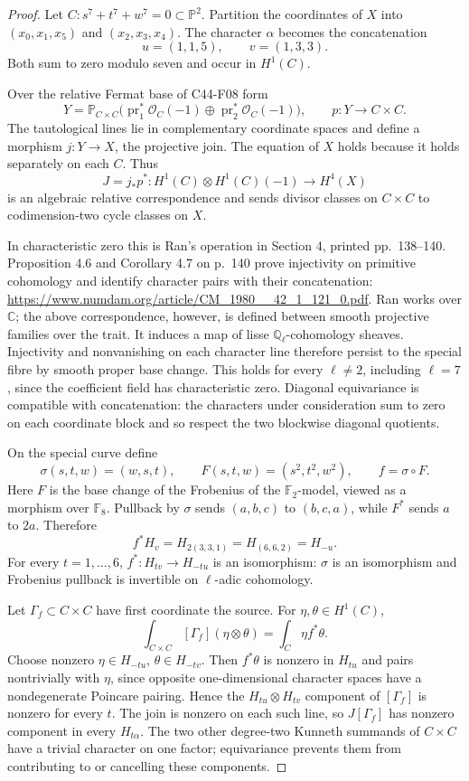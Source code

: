 \documentclass[11pt]{article}
\theoremstyle{remark}\newtheorem{remark}[theorem]{Remark}
\begin{document}
\begin{proof}
Let \(C:s^7+t^7+w^7=0\subset\mathbb P^2\). Partition the coordinates
of \(X\) into \((x_0,x_1,x_5)\) and \((x_2,x_3,x_4)\). The character
\(\alpha\) becomes the concatenation
\[
 u=(1,1,5),\qquad v=(1,3,3).
\]
Both sum to zero modulo seven and occur in \(H^1(C)\).

Over the relative Fermat base of C44-F08 form
\[
 Y=\mathbb P_{C\times C}
 \bigl(\operatorname{pr}_1^*\mathcal O_C(-1)
       \oplus\operatorname{pr}_2^*\mathcal O_C(-1)\bigr),
 \qquad p:Y\longrightarrow C\times C.
\]
The tautological lines lie in complementary coordinate spaces
and define a morphism \(j:Y\to X\), the projective join. The
equation of \(X\) holds because it holds separately on each \(C\).
Thus
\[
 J=j_*p^*:H^1(C)\otimes H^1(C)(-1)\longrightarrow H^4(X)
\]
is an algebraic relative correspondence and sends divisor classes
on \(C\times C\) to codimension-two cycle classes on \(X\).

In characteristic zero this is Ran's operation in Section 4,
printed pp.~138--140. Proposition 4.6 and Corollary 4.7 on p.~140
prove injectivity on primitive cohomology and identify character
pairs with their concatenation:
\url{https://www.numdam.org/article/CM_1980__42_1_121_0.pdf}.
Ran works over \(\mathbb C\); the above correspondence, however,
is defined between smooth projective families over the trait.
It induces a map of lisse \(\mathbb Q_\ell\)-cohomology sheaves.
Injectivity and nonvanishing on each character line therefore
persist to the special fibre by smooth proper base change.
This holds for every \(\ell\ne2\), including \(\ell=7\), since the
coefficient field has characteristic zero. Diagonal equivariance
is compatible with concatenation: the characters under consideration
sum to zero on each coordinate block and so respect the two
blockwise diagonal quotients.

On the special curve define
\[
 \sigma(s,t,w)=(w,s,t),\qquad F(s,t,w)=(s^2,t^2,w^2),
 \qquad f=\sigma\circ F.
\]
Here \(F\) is the base change of the Frobenius of the
\(\mathbb F _2\)-model, viewed as a morphism over \(\mathbb F _8\).
Pullback by \(\sigma\) sends \((a,b,c)\) to \((b,c,a)\),
while \(F^*\) sends \(a\) to \(2a\). Therefore
\[
 f^*H_v=H_{2(3,3,1)}=H_{(6,6,2)}=H_{-u}.
\]
For every \(t=1,\ldots,6\), \(f^*:H_{tv}\to H_{-tu}\) is an
isomorphism: \(\sigma\) is an isomorphism and Frobenius pullback
is invertible on \(\ell\)-adic cohomology.

Let \(\Gamma_f\subset C\times C\) have first coordinate the source.
For \(\eta,\theta\in H^1(C)\),
\[
 \int_{C\times C}[\Gamma_f](\eta\otimes\theta)
   =\int_C\eta f^*\theta.
\]
Choose nonzero \(\eta\in H_{-tu}\), \(\theta\in H_{-tv}\).
Then \(f^*\theta\) is nonzero in \(H_{tu}\) and pairs nontrivially
with \(\eta\), since opposite one-dimensional character spaces
have a nondegenerate Poincare pairing. Hence the
\(H_{tu}\otimes H_{tv}\) component of \([\Gamma_f]\) is nonzero
for every \(t\). The join is nonzero on each such line, so
\(J[\Gamma_f]\) has nonzero component in every \(H_{t\alpha}\).
The two other degree-two Kunneth summands of \(C\times C\)
have a trivial character on one factor; equivariance prevents
them from contributing to or cancelling these components.


\end{proof}
\end{document}
